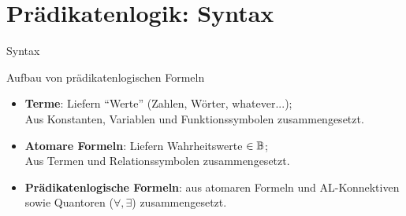 

\section{Prädikatenlogik: Syntax}

\begin{frame}{Syntax}
	\begin{block}{Aufbau von prädikatenlogischen Formeln}
	\begin{itemize}[<+->]
		\item \textbf{Terme}: Liefern \enquote{Werte} (Zahlen, Wörter, whatever...); \\ 
		Aus Konstanten, Variablen und Funktionssymbolen zusammengesetzt.
		\item \textbf{Atomare Formeln}: Liefern Wahrheitswerte $\in \mathbb{B}$; \\
		 Aus Termen und Relationssymbolen zusammengesetzt.
		\item \textbf{Prädikatenlogische Formeln}: aus atomaren Formeln und AL-Konnektiven sowie Quantoren ($\forall, \exists$) zusammengesetzt. 
	\end{itemize}
	\end{block}
\end{frame}

